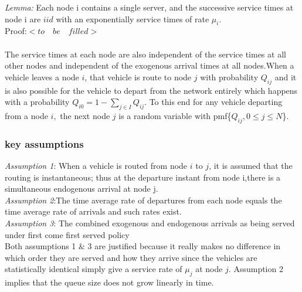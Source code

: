 \documentclass[a4paper,12pt]{scrartcl}
\begin{document}
\textit{Lemma:} Each node i contains a single server, and the successive service times at node i are $iid$ with an exponentially service times of rate $\mu_i$.\\
Proof:$< to \quad be \quad filled>$\\
\\
The service times at each node are also independent of the service times at all other nodes and independent of the exogenous arrival times at all nodes.When a vehicle leaves a node $i$, that vehicle is route to node $j$ with probability $Q_{ij}$ and it is also possible for the vehicle to depart from the network entirely which happens with a probability $Q_{i0} = 1 - \sum_{j \in I}Q_{ij}.$ To this end for any vehicle departing from a node $i,$ the next node $j$ is a random variable with pmf\{$Q_{ij},0 \leq j \leq N$\}.

\subsubsection*{key assumptions}
\textit{Assumption 1}: When a vehicle is routed from node $i$ to $j$, it is assumed that the routing is instantaneous; thus at the departure instant from node i,there is a simultaneous endogenous arrival at node j.\\
\textit{Assumption 2}:The time average rate of departures from each node equals the time average rate of arrivals and such rates exist.\\
\textit{Assumption 3}: The combined exogenous and endogenous arrivals as being served under first come first served policy\\
Both assumptions 1 $\&$ 3 are justified because it really makes no difference in which order they are served and how they arrive since the vehicles are statistically identical  simply give a service rate of $\mu_j$ at node $j$. Assumption 2 implies that the queue size does not grow linearly in time. 
\end{document}
